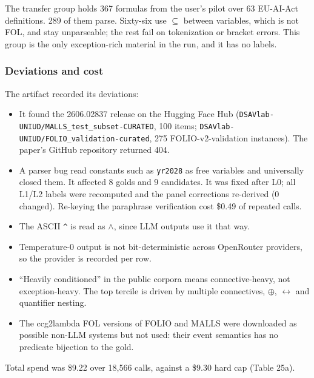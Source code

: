 \documentclass[11pt,letterpaper]{article}
\begin{document}
The transfer group holds 367 formulas from the user's pilot over 63 EU-AI-Act definitions. 289 of them parse. Sixty-six use \texttt{$\subseteq$} between variables, which is not FOL, and stay unparseable; the rest fail on tokenization or bracket errors. This group is the only exception-rich material in the run, and it has no labels.

\subsubsection{Deviations and cost}

The artifact recorded its deviations:

\begin{itemize}
\item {}It found the 2606.02837 release on the Hugging Face Hub (\texttt{DSAVlab-\allowbreak{}UNIUD/\allowbreak{}MALLS\_\allowbreak{}\allowbreak{}test\_\allowbreak{}\allowbreak{}subset-\allowbreak{}CURATED}, 100 items; \texttt{DSAVlab-\allowbreak{}UNIUD/\allowbreak{}FOLIO\_\allowbreak{}\allowbreak{}validation-\allowbreak{}curated}, 275 FOLIO-v2-validation instances). The paper's GitHub repository returned 404.
\item {}A parser bug read constants such as \texttt{yr2028} as free variables and universally closed them. It affected 8 golds and 9 candidates. It was fixed after L0; all L1/L2 labels were recomputed and the panel corrections re-derived (0 changed). Re-keying the paraphrase verification cost \$0.49 of repeated calls.
\item {}The ASCII \texttt{\textasciicircum{}} is read as $\wedge$, since LLM outputs use it that way.
\item {}Temperature-0 output is not bit-deterministic across OpenRouter providers, so the provider is recorded per row.
\item {}``Heavily conditioned'' in the public corpora means connective-heavy, not exception-heavy. The top tercile is driven by multiple connectives, $\oplus$, $\leftrightarrow$ and quantifier nesting.
\item {}The ccg2lambda FOL versions of FOLIO and MALLS were downloaded as possible non-LLM systems but not used: their event semantics has no predicate bijection to the gold.
\end{itemize}
Total spend was \$9.22 over 18,566 calls, against a \$9.30 hard cap (Table 25a).
\end{document}

